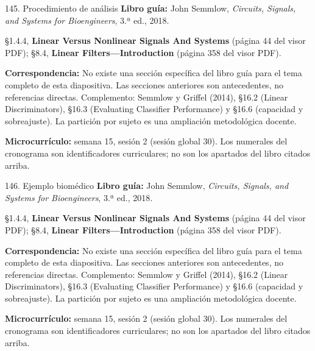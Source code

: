 \documentclass[
  10pt,
  ignorenonframetext,
  aspectratio=169,
  spanish,
]{beamer}
\begin{document}
\begin{frame}{145. Procedimiento de análisis}
\label{procedimiento-de-anuxe1lisis-9}
\textbf{Libro guía:} John Semmlow, \emph{Circuits, Signals, and Systems
for Bioengineers}, 3.ª ed., 2018.

§1.4.4, \textbf{Linear Versus Nonlinear Signals And Systems} (página 44
del visor PDF); §8.4, \textbf{Linear Filters---Introduction} (página 358
del visor PDF).

\textbf{Correspondencia:} No existe una sección específica del libro
guía para el tema completo de esta diapositiva. Las secciones anteriores
son antecedentes, no referencias directas. Complemento: Semmlow y
Griffel (2014), §16.2 (Linear Discriminators), §16.3 (Evaluating
Classifier Performance) y §16.6 (capacidad y sobreajuste). La partición
por sujeto es una ampliación metodológica docente.

\textbf{Microcurrículo:} semana 15, sesión 2 (sesión global 30). Los
numerales del cronograma son identificadores curriculares; no son los
apartados del libro citados arriba.
\end{frame}

\begin{frame}{146. Ejemplo biomédico}
\label{ejemplo-biomuxe9dico-9}
\textbf{Libro guía:} John Semmlow, \emph{Circuits, Signals, and Systems
for Bioengineers}, 3.ª ed., 2018.

§1.4.4, \textbf{Linear Versus Nonlinear Signals And Systems} (página 44
del visor PDF); §8.4, \textbf{Linear Filters---Introduction} (página 358
del visor PDF).

\textbf{Correspondencia:} No existe una sección específica del libro
guía para el tema completo de esta diapositiva. Las secciones anteriores
son antecedentes, no referencias directas. Complemento: Semmlow y
Griffel (2014), §16.2 (Linear Discriminators), §16.3 (Evaluating
Classifier Performance) y §16.6 (capacidad y sobreajuste). La partición
por sujeto es una ampliación metodológica docente.

\textbf{Microcurrículo:} semana 15, sesión 2 (sesión global 30). Los
numerales del cronograma son identificadores curriculares; no son los
apartados del libro citados arriba.
\end{frame}
\end{document}
